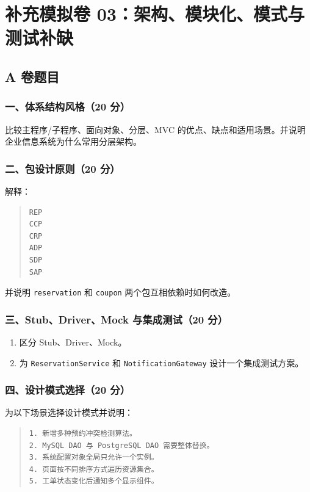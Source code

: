 \documentclass[UTF8,zihao=-4]{ctexart}
\begin{document}
\section{补充模拟卷 03：架构、模块化、模式与测试补缺}


\subsection{A 卷题目}


\subsubsection*{一、体系结构风格（20 分）}


比较主程序/子程序、面向对象、分层、MVC 的优点、缺点和适用场景。并说明企业信息系统为什么常用分层架构。


\subsubsection*{二、包设计原则（20 分）}


解释：


\begin{quote}
\footnotesize
\begin{verbatim}
REP
CCP
CRP
ADP
SDP
SAP
\end{verbatim}
\end{quote}


并说明 \texttt{reservation} 和 \texttt{coupon} 两个包互相依赖时如何改造。


\subsubsection*{三、Stub、Driver、Mock 与集成测试（20 分）}


\begin{enumerate}
\item 区分 Stub、Driver、Mock。
\item 为 \texttt{ReservationService} 和 \texttt{NotificationGateway} 设计一个集成测试方案。
\end{enumerate}


\subsubsection*{四、设计模式选择（20 分）}


为以下场景选择设计模式并说明：


\begin{quote}
\footnotesize
\begin{verbatim}
1. 新增多种预约冲突检测算法。
2. MySQL DAO 与 PostgreSQL DAO 需要整体替换。
3. 系统配置对象全局只允许一个实例。
4. 页面按不同排序方式遍历资源集合。
5. 工单状态变化后通知多个显示组件。
\end{verbatim}
\end{quote}
\end{document}
